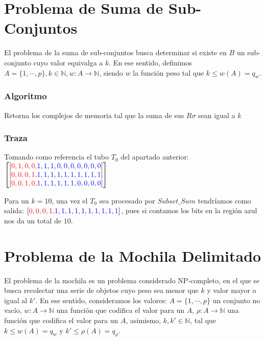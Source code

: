 \documentclass[12pt, letterpaper, twoside]{article}
\begin{document}
    \section{Problema de Suma de Sub-Conjuntos}
    \par El problema de la suma de sub-conjuntos busca determinar si existe en $B$ un sub-conjunto cuyo valor equivalga a $k$. En ese sentido, definimos $A=\{1,\cdots,p\}, k\in\mathbb{N}, w:A\rightarrow\mathbb{N}$, siendo $w$ la función peso tal que $k\leq w(A)=q_w$.
    \subsubsection{Algoritmo}
    \begin{algorithm}
        \caption{Retorna los complejos de memoria tal que la suma de sus $R\sigma$ sean igual a $k$}
        \label{SubsetSum}
        \begin{algorithmic}[1]
            \EndProcedure
        \end{algorithmic}
    \end{algorithm}
    \subsubsection{Traza}
    \par Tomando como referencia el tubo $T_0$ del apartado anterior: \\
    $
        \begin{bmatrix}
            [\textcolor{red}{0, 1, 0, 0,} \textcolor{blue}{1, 1, 1, 0, 0, 0, 0, 0, 0, 0}] \\
            [\textcolor{red}{0, 0, 0, 1,} \textcolor{blue}{1, 1, 1, 1, 1, 1, 1, 1, 1, 1}] \\
            [\textcolor{red}{0, 0, 1, 0,} \textcolor{blue}{1, 1, 1, 1, 1, 1, 0, 0, 0, 0}]
        \end{bmatrix}
    $
    \par Para un $k=10$, una vez el $T_0$ sea procesado por $Subset\_Sum$ tendríamos como salida: $[\textcolor{red}{0, 0, 0, 1,} \textcolor{blue}{1, 1, 1, 1, 1, 1, 1, 1, 1, 1}]$, pues si contamos los bits en la región azul nos da un total de $10$.
    \section{Problema de la Mochila Delimitado}
    \par El problema de la mochila es un problema considerado NP-completo, en el que se busca recolectar una serie de objetos cuyo peso sea menor que $k$ y valor mayor o igual al $k'$. En ese sentido, consideramos los valores: $A=\{1,\cdots,p\}$ un conjunto no vacío, $w:A\rightarrow\mathbb{N}$ una función que codifica el valor para un $A$, $\rho:A\rightarrow\mathbb{N}$ una función que codifica el valor para un $A$, asimismo, $k,k'\in\mathbb{N}$, tal que $k\leq w(A)=q_w$ y $k'\leq \rho(A)=q_\rho$.
\end{document}
